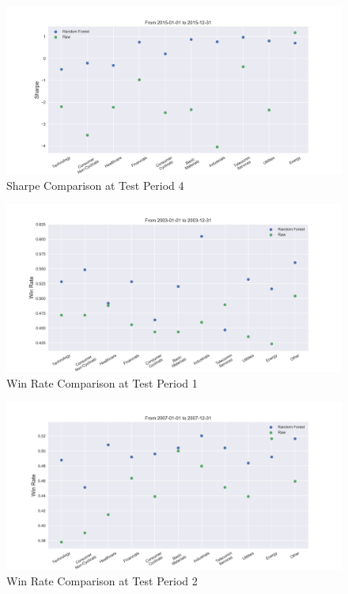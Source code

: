 \documentclass[12pt]{article}
\begin{document}
\begin{figure}[!ht]
  \begin{center}
    \includegraphics[width=1\linewidth]{figure/rf_raw_Sharpe_time_3.png}
  \end{center}
  \caption{Sharpe Comparison at Test Period 4}
  \label{fig:rf_raw_Sharpe_time_4}
\end{figure}

\begin{figure}[!ht]
  \begin{center}
    \includegraphics[width=1\linewidth]{figure/rf_raw_win_rate_time_0.png}
  \end{center}
  \caption{Win Rate Comparison at Test Period 1}
  \label{fig:rf_raw_win_rate_time_1}
\end{figure}

\begin{figure}[!ht]
  \begin{center}
    \includegraphics[width=1\linewidth]{figure/rf_raw_win_rate_time_1.png}
  \end{center}
  \caption{Win Rate Comparison at Test Period 2}
  \label{fig:rf_raw_win_rate_time_2}
\end{figure}
\end{document}
